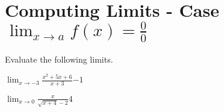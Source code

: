 
\section{Computing Limits - Case $\displaystyle \lim_{x\rightarrow a} f(x)=\frac{0}{0}$}

Evaluate the following limits.

\problemans%
{$\displaystyle \lim_{x\rightarrow-3} {\frac{x^2 + 5x + 6}{x + 3} }$}{$-1$}

\problemans%
{$\displaystyle \lim_{x\rightarrow0} {\frac{x}{\sqrt{x + 4} - 2} }$}{$4$}


